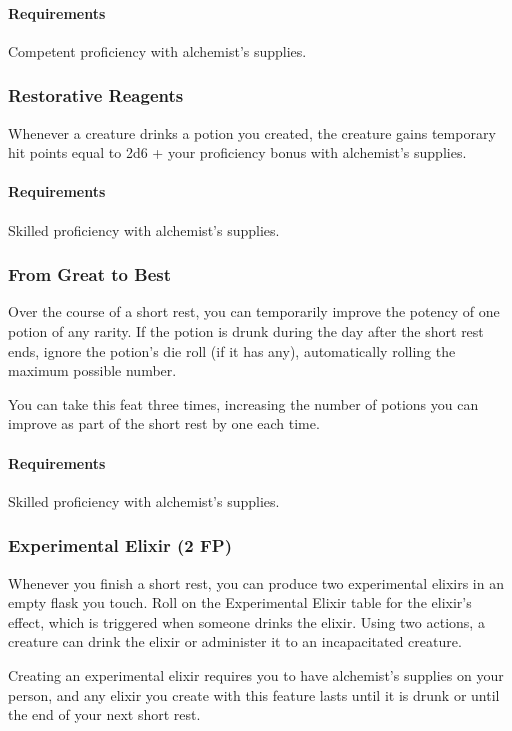     \paragraph{Requirements} Competent proficiency with alchemist's supplies.
\subsubsection{Restorative Reagents} \label{feat::restorativereagents}
    Whenever a creature drinks a potion you created, the creature gains temporary hit points equal to 2d6 + your proficiency bonus with alchemist's supplies.
    \paragraph{Requirements} Skilled proficiency with alchemist's supplies.
\subsubsection{From Great to Best} \label{feat::fromgreattobest}
    Over the course of a short rest, you can temporarily improve the potency of one potion of any rarity.
    If the potion is drunk during the day after the short rest ends, ignore the potion's die roll (if it has any), automatically rolling the maximum possible number.

    You can take this feat three times, increasing the number of potions you can improve as part of the short rest by one each time.
    \paragraph{Requirements} Skilled proficiency with alchemist's supplies.
\subsubsection{Experimental Elixir (2 FP)} \label{feat::experimentalelixir}
    Whenever you finish a short rest, you can produce two experimental elixirs in an empty flask you touch.
    Roll on the Experimental Elixir table for the elixir's effect, which is triggered when someone drinks the elixir.
    Using two actions, a creature can drink the elixir or administer it to an incapacitated creature.

    Creating an experimental elixir requires you to have alchemist's supplies on your person, and any elixir you create with this feature lasts until it is drunk or until the end of your next short rest.

